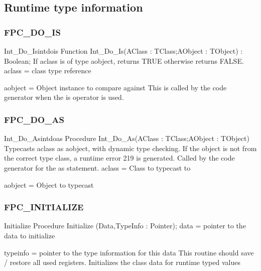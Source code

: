 \documentclass [a4paper,12pt]{article}
\begin{document}
\subsection{Runtime type information}
\label{subsec:runtime}

\subsubsection{FPC{\_}DO{\_}IS}
\label{subsubsec:mylabel69}

\begin{functionl}{Int{\_}Do{\_}Is}{intdois}
\Declaration
Function Int{\_}Do{\_}Is(AClass : TClass;AObject : TObject) : Boolean;
\Description
If \textsf{aclass} is of type \textsf{aobject}, returns TRUE otherwise
returns FALSE.
\Parameters
aclass = class type reference \par
aobject = Object instance to compare against
\Notes
This is called by the code generator when the \textsf{is} operator is used.
\Algorithm
\end{functionl}

\subsubsection{FPC{\_}DO{\_}AS}
\label{subsubsec:mylabel70}

\begin{procedurel}{Int{\_}Do{\_}As}{intdoas}
\Declaration
Procedure Int{\_}Do{\_}As(AClass : TClass;AObject : TObject)
\Description
Typecasts \textsf{aclass} as \textsf{aobject}, with dynamic type checking.
If the object is not from the correct type class, a runtime error 219 is
generated. Called by the code generator for the \textsf{as} statement.
\Parameters
aclass = Class to typecast to \par
aobject = Object to typecast
\end{procedurel}

\subsubsection{FPC{\_}INITIALIZE }
\label{subsubsec:mylabel71}

\begin{procedure}{Initialize}
\Declaration
Procedure Initialize (Data,TypeInfo : Pointer);
\Description
\Parameters
data = pointer to the data to initialize \par
typeinfo = pointer to the type information for this data
\Notes
This routine should save / restore all used registers.
\Algorithm
Initializes the class data for runtime typed values
\end{procedure}
\end{document}
